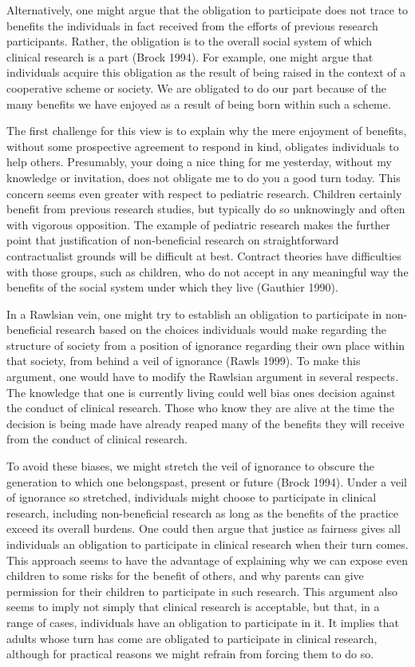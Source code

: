 \documentclass[12p]{article}
\begin{document}
Alternatively, one might argue that the obligation to participate does not trace to benefits the individuals in fact received from the efforts of previous research participants. Rather, the obligation is to the overall social system of which clinical research is a part (Brock 1994). For example, one might argue that individuals acquire this obligation as the result of being raised in the context of a cooperative scheme or society. We are obligated to do our part because of the many benefits we have enjoyed as a result of being born within such a scheme.

The first challenge for this view is to explain why the mere enjoyment of benefits, without some prospective agreement to respond in kind, obligates individuals to help others. Presumably, your doing a nice thing for me yesterday, without my knowledge or invitation, does not obligate me to do you a good turn today. This concern seems even greater with respect to pediatric research. Children certainly benefit from previous research studies, but typically do so unknowingly and often with vigorous opposition. The example of pediatric research makes the further point that justification of non-beneficial research on straightforward contractualist grounds will be difficult at best. Contract theories have difficulties with those groups, such as children, who do not accept in any meaningful way the benefits of the social system under which they live (Gauthier 1990).

In a Rawlsian vein, one might try to establish an obligation to participate in non-beneficial research based on the choices individuals would make regarding the structure of society from a position of ignorance regarding their own place within that society, from behind a veil of ignorance (Rawls 1999). To make this argument, one would have to modify the Rawlsian argument in several respects. The knowledge that one is currently living could well bias ones decision against the conduct of clinical research. Those who know they are alive at the time the decision is being made have already reaped many of the benefits they will receive from the conduct of clinical research.

To avoid these biases, we might stretch the veil of ignorance to obscure the generation to which one belongspast, present or future (Brock 1994). Under a veil of ignorance so stretched, individuals might choose to participate in clinical research, including non-beneficial research as long as the benefits of the practice exceed its overall burdens. One could then argue that justice as fairness gives all individuals an obligation to participate in clinical research when their turn comes. This approach seems to have the advantage of explaining why we can expose even children to some risks for the benefit of others, and why parents can give permission for their children to participate in such research. This argument also seems to imply not simply that clinical research is acceptable, but that, in a range of cases, individuals have an obligation to participate in it. It implies that adults whose turn has come are obligated to participate in clinical research, although for practical reasons we might refrain from forcing them to do so.
\end{document}
